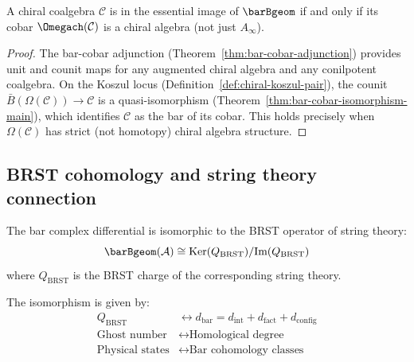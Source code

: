\begin{corollary}
\label{cor:recognition-principle}
A chiral coalgebra $\mathcal{C}$ is in the essential image of $\barBgeom$ if and only if its cobar $\Omegach(\mathcal{C})$ is a chiral algebra (not just $A_\infty$).
\end{corollary}
\begin{proof}
The bar-cobar adjunction (Theorem~\ref{thm:bar-cobar-adjunction})
provides unit and counit maps for any augmented chiral algebra and
any conilpotent coalgebra.  On the Koszul locus
(Definition~\ref{def:chiral-koszul-pair}), the counit
$\bar{B}(\Omega(\mathcal{C})) \to \mathcal{C}$ is a
quasi-isomorphism (Theorem~\ref{thm:bar-cobar-isomorphism-main}),
which identifies $\mathcal{C}$ as the bar of its cobar.
This holds precisely when $\Omega(\mathcal{C})$ has strict
(not homotopy) chiral algebra structure.
\end{proof}

\subsection{BRST cohomology and string theory connection}

\begin{conjecture}\label{conj:brst-cohomology}
The bar complex differential is isomorphic to the BRST operator of string theory:
\[\barBgeom(\mathcal{A}) \cong \text{Ker}(Q_{\text{BRST}})/\text{Im}(Q_{\text{BRST}})\]
where $Q_{\text{BRST}}$ is the BRST charge of the corresponding string theory.

The isomorphism is given by:
\begin{align}
Q_{\text{BRST}} &\leftrightarrow d_{\text{bar}} = d_{\text{int}} + d_{\text{fact}} + d_{\text{config}} \\
\text{Ghost number} &\leftrightarrow \text{Homological degree} \\
\text{Physical states} &\leftrightarrow \text{Bar cohomology classes}
\end{align}
\end{conjecture}

